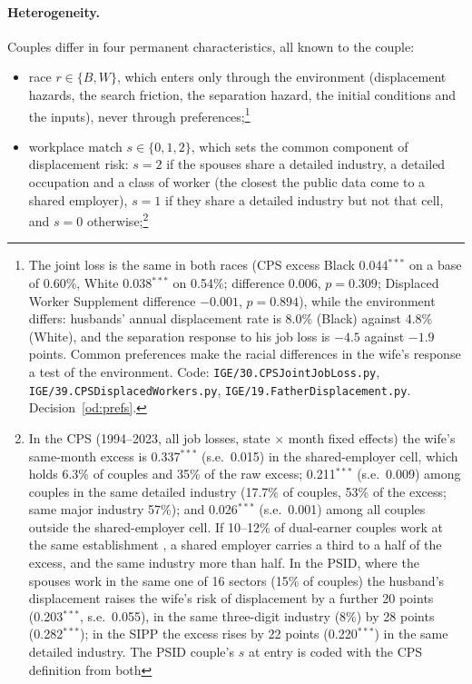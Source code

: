 \documentclass[11pt]{article}
\newcommand{\code}[1]{\texttt{#1}}
\newcommand{\1}{\mathbf{1}}
\begin{document}
\paragraph{Heterogeneity.} Couples differ in four permanent characteristics, all known to the couple:
\begin{itemize}
  \item race $r \in \{B, W\}$, which enters only through the environment (displacement hazards, the search friction, the
  separation hazard, the initial conditions and the inputs), never through preferences;\footnote{The joint loss is the
  same in both races (CPS excess Black 0.044$^{***}$ on a base of 0.60\%, White 0.038$^{***}$ on 0.54\%; difference 0.006,
  $p=0.309$; Displaced Worker Supplement difference $-0.001$, $p=0.894$), while the environment differs: husbands'
  annual displacement rate is 8.0\% (Black) against 4.8\% (White), and the separation response to his job loss is
  $-4.5$ against $-1.9$ points. Common preferences make the racial differences in the wife's response a test of the
  environment. Code: \code{IGE/30.CPSJointJobLoss.py}, \code{IGE/39.CPSDisplacedWorkers.py},
  \code{IGE/19.FatherDisplacement.py}. Decision~\ref{od:prefs}.}
  \item workplace match $s \in \{0, 1, 2\}$, which sets the common component of displacement risk: $s=2$ if the spouses
  share a detailed industry, a detailed occupation and a class of worker (the closest the public data come to a shared
  employer), $s=1$ if they share a detailed industry but not that cell, and $s=0$ otherwise;\footnote{In the CPS
  (1994--2023, all job losses, state $\times$ month fixed effects) the wife's same-month excess is 0.337$^{***}$ (s.e.\
  0.015) in the shared-employer cell, which holds 6.3\% of couples and 35\% of the raw excess; 0.211$^{***}$ (s.e.\
  0.009) among couples in the same detailed industry (17.7\% of couples, 53\% of the excess; same major industry 57\%);
  and 0.026$^{***}$ (s.e.\ 0.001) among all couples outside the shared-employer cell. If 10--12\% of dual-earner couples
  work at the same establishment \citep{hyatt2019coworking}, a shared employer carries a third to a half of the excess,
  and the same industry more than half. In the PSID, where the spouses work in the same one of 16 sectors (15\% of
  couples) the husband's displacement raises the wife's risk of displacement by a further 20 points (0.203$^{***}$, s.e.\
  0.055), in the same three-digit industry (8\%) by 28 points (0.282$^{***}$); in the SIPP the excess rises by 22 points
  (0.220$^{***}$) in the same detailed industry. The PSID couple's $s$ at entry is coded with the CPS definition from both
}
\end{itemize}
\end{document}

